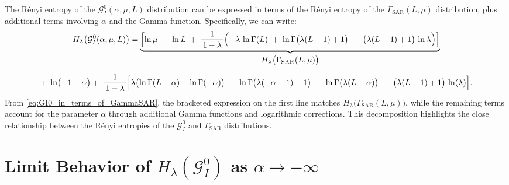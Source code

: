 \documentclass[11pt,]{article}
\begin{document}
The Rényi entropy of the \(\mathcal{G}^0_I(\alpha,\mu,L)\) distribution
can be expressed in terms of the Rényi entropy of the
\(\Gamma_{\mathrm{SAR}}(L,\mu)\) distribution, plus additional terms
involving \(\alpha\) and the Gamma function. Specifically, we can write:
\begin{multline}
H_\lambda\bigl(\mathcal{G}^0_I(\alpha,\mu,L)\bigr)
= 
\underbrace{\Bigl[
  \ln\mu \;-\;\ln L 
  \;+\; \frac{1}{\,1-\lambda\,}\Bigl(
    -\lambda \,\ln\Gamma(L) 
    \;+\;\ln\Gamma\bigl(\lambda(L-1)+1\bigr)
    \;-\;\bigl(\lambda(L-1)+1\bigr)\,\ln\lambda
  \Bigr)
\Bigr]}_{\displaystyle H_\lambda\bigl(\Gamma_{\mathrm{SAR}}(L,\mu)\bigr)}
\\[6pt]
+~\ln\bigl(-1-\alpha\bigr)
+~\frac{1}{\,1-\lambda\,} 
 \Bigl[
   \lambda\bigl(\ln\Gamma(L-\alpha) - \ln\Gamma(-\alpha)\bigr)
   \;+\;\ln\Gamma\bigl(\lambda(-\alpha+1)-1\bigr)
   \;-\;\ln\Gamma\bigl(\lambda(L-\alpha)\bigr)
   \;+\;\bigl(\lambda(L-1)+1\bigr)\,\ln(\lambda)
 \Bigr].
\label{eq:GI0_in_terms_of_GammaSAR}
\end{multline} From \eqref{eq:GI0_in_terms_of_GammaSAR}, the bracketed
expression on the first line matches
\(H_\lambda\bigl(\Gamma_{\mathrm{SAR}}(L,\mu)\bigr)\), while the
remaining terms account for the parameter \(\alpha\) through additional
Gamma functions and logarithmic corrections. This decomposition
highlights the close relationship between the Rényi entropies of the
\(\mathcal{G}^0_I\) and \(\Gamma_{\mathrm{SAR}}\) distributions.

\section{\texorpdfstring{Limit Behavior of
\texorpdfstring{$H_\lambda(\mathcal{G}^0_I)$}{Hl(GI0)} as
\texorpdfstring{$\alpha \to -\infty$}{alpha->-∞}}{Limit Behavior of  as }}\label{limit-behavior-of-as}
\end{document}
